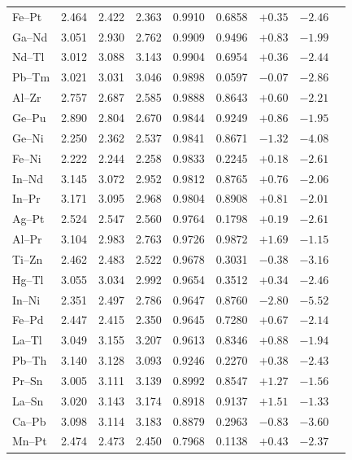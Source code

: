 \documentclass[a4paper,10pt,5p]{elsarticle}
\begin{document}
\begin{table}[htbp]
{\begin{tabular}{lcccccccc}
        Fe--Pt & 2.464 & 2.422 & 2.363 & 0.9910 & 0.6858 & $+0.35$ & $-2.46$ \\
        Ga--Nd & 3.051 & 2.930 & 2.762 & 0.9909 & 0.9496 & $+0.83$ & $-1.99$ \\
        Nd--Tl & 3.012 & 3.088 & 3.143 & 0.9904 & 0.6954 & $+0.36$ & $-2.44$ \\
        Pb--Tm & 3.021 & 3.031 & 3.046 & 0.9898 & 0.0597 & $-0.07$ & $-2.86$ \\
        Al--Zr & 2.757 & 2.687 & 2.585 & 0.9888 & 0.8643 & $+0.60$ & $-2.21$ \\
        Ge--Pu & 2.890 & 2.804 & 2.670 & 0.9844 & 0.9249 & $+0.86$ & $-1.95$ \\
        Ge--Ni & 2.250 & 2.362 & 2.537 & 0.9841 & 0.8671 & $-1.32$ & $-4.08$ \\
        Fe--Ni & 2.222 & 2.244 & 2.258 & 0.9833 & 0.2245 & $+0.18$ & $-2.61$ \\
        In--Nd & 3.145 & 3.072 & 2.952 & 0.9812 & 0.8765 & $+0.76$ & $-2.06$ \\
        In--Pr & 3.171 & 3.095 & 2.968 & 0.9804 & 0.8908 & $+0.81$ & $-2.01$ \\
        Ag--Pt & 2.524 & 2.547 & 2.560 & 0.9764 & 0.1798 & $+0.19$ & $-2.61$ \\
        Al--Pr & 3.104 & 2.983 & 2.763 & 0.9726 & 0.9872 & $+1.69$ & $-1.15$ \\
        Ti--Zn & 2.462 & 2.483 & 2.522 & 0.9678 & 0.3031 & $-0.38$ & $-3.16$ \\
        Hg--Tl & 3.055 & 3.034 & 2.992 & 0.9654 & 0.3512 & $+0.34$ & $-2.46$ \\
        In--Ni & 2.351 & 2.497 & 2.786 & 0.9647 & 0.8760 & $-2.80$ & $-5.52$ \\
        Fe--Pd & 2.447 & 2.415 & 2.350 & 0.9645 & 0.7280 & $+0.67$ & $-2.14$ \\
        La--Tl & 3.049 & 3.155 & 3.207 & 0.9613 & 0.8346 & $+0.88$ & $-1.94$ \\
        Pb--Th & 3.140 & 3.128 & 3.093 & 0.9246 & 0.2270 & $+0.38$ & $-2.43$ \\
        Pr--Sn & 3.005 & 3.111 & 3.139 & 0.8992 & 0.8547 & $+1.27$ & $-1.56$ \\
        La--Sn & 3.020 & 3.143 & 3.174 & 0.8918 & 0.9137 & $+1.51$ & $-1.33$ \\
        Ca--Pb & 3.098 & 3.114 & 3.183 & 0.8879 & 0.2963 & $-0.83$ & $-3.60$ \\
        Mn--Pt & 2.474 & 2.473 & 2.450 & 0.7968 & 0.1138 & $+0.43$ & $-2.37$ \\

\end{tabular}}
\end{table}
\end{document}
